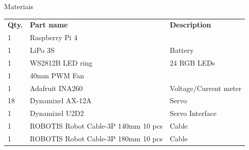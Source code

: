\begin{frame}[c]{Materiais}
    \begin{center}
\begin{table}[]
    \small
    \begin{tabular}{lll}
    \rowcolor[HTML]{FCFCFC} 
    {\color[HTML]{404040} \textbf{Qty.}} & {\color[HTML]{404040} \textbf{Part name}}                  & {\color[HTML]{404040} \textbf{Description}}  \\
    \rowcolor[HTML]{F3F6F6} 
    {\color[HTML]{404040} 1}             & {\color[HTML]{404040} Raspberry Pi 4}                      & {\color[HTML]{404040} }                      \\
    \rowcolor[HTML]{FCFCFC} 
    {\color[HTML]{404040} 1}             & {\color[HTML]{404040} LiPo 3S}                             & {\color[HTML]{404040} Battery}               \\
    \rowcolor[HTML]{F3F6F6} 
    {\color[HTML]{404040} 1}             & {\color[HTML]{404040} WS2812B LED ring}                    & {\color[HTML]{404040} 24 RGB LEDs}           \\
    \rowcolor[HTML]{FCFCFC} 
    {\color[HTML]{404040} 1}             & {\color[HTML]{404040} 40mm PWM Fan}                        & {\color[HTML]{404040} }                      \\
    \rowcolor[HTML]{F3F6F6} 
    {\color[HTML]{404040} 1}             & {\color[HTML]{404040} Adafruit INA260}                     & {\color[HTML]{404040} Voltage/Current meter} \\
    \rowcolor[HTML]{FCFCFC} 
    {\color[HTML]{404040} 18}            & {\color[HTML]{404040} Dynamixel AX-12A}                    & {\color[HTML]{404040} Servo}                 \\
    \rowcolor[HTML]{F3F6F6} 
    {\color[HTML]{404040} 1}             & {\color[HTML]{404040} Dynamixel U2D2}                      & {\color[HTML]{404040} Servo Interface}       \\
    \rowcolor[HTML]{FCFCFC} 
    {\color[HTML]{404040} 1}             & {\color[HTML]{404040} ROBOTIS Robot Cable-3P 140mm 10 pcs} & {\color[HTML]{404040} Cable}                 \\
    \rowcolor[HTML]{F3F6F6} 
    {\color[HTML]{404040} 1}             & {\color[HTML]{404040} ROBOTIS Robot Cable-3P 180mm 10 pcs} & {\color[HTML]{404040} Cable}                 \\

\end{tabular}
\end{table}
\end{center}
\end{frame}
